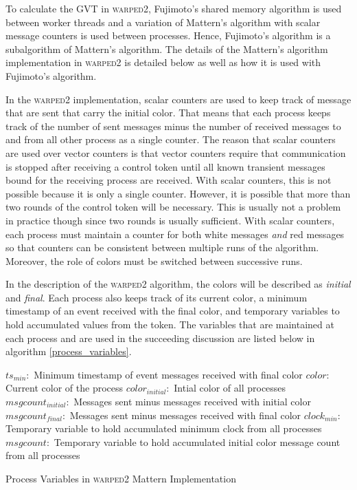 \documentclass[11pt]{book}
\begin{document}
To calculate the GVT in \textsc{warped2}, Fujimoto's shared memory algorithm is used between
worker threads and a variation of Mattern's algorithm with scalar message counters is used
between processes. Hence, Fujimoto's algorithm is a subalgorithm of Mattern's algorithm.
The details of the Mattern's algorithm implementation in \textsc{warped2} is detailed below
as well as how it is used with Fujimoto's algorithm.

In the \textsc{warped2} implementation, scalar counters are used to keep track of message
that are sent that carry the initial color. That means that each process keeps track of
the number of sent messages minus the number of received messages to and from all other
process as a single counter. The reason that scalar counters are used over vector counters
is that vector counters require that communication is stopped after receiving a control token
until all known transient messages bound for the receiving process are received. With scalar
counters, this is not possible because it is only a single counter. However, it is possible
that more than two rounds of the control token will be necessary. This is usually not a
problem in practice though since two rounds is usually sufficient. With scalar counters,
each process must maintain a counter for both white messages \emph{and} red messages so
that counters can be consistent between multiple runs of the algorithm. Moreover, the role
of colors must be switched between successive runs.

In the description of the \textsc{warped2} algorithm, the colors will be described as
\emph{initial} and \emph{final}. Each process also keeps track of its current color, a
minimum timestamp of an event received with the final color, and temporary variables to
hold accumulated values from the token. The variables that are maintained at each
process and are used in the succeeding discussion are listed below in algorithm
\ref{process_variables}.

\begin{algorithm}
\DontPrintSemicolon
    \boldmath$ts_{min}:$ Minimum timestamp of event messages received with final color\;
    \boldmath$color:$ Current color of the process\;
    \boldmath$color_{initial}:$ Intial color of all processes\;
    \boldmath$msgcount_{initial}:$ Messages sent minus messages received with initial color\;
    \boldmath$msgcount_{final}:$ Messages sent minus messages received with final color\;
    \boldmath$clock_{min}:$ Temporary variable to hold accumulated minimum clock from all
        processes\;
    \boldmath$msgcount:$ Temporary variable to hold accumulated initial color message count
        from all processes\;
\caption{Process Variables in \textsc{warped2} Mattern Implementation}\label{process_variables}
\end{algorithm}
\end{document}
